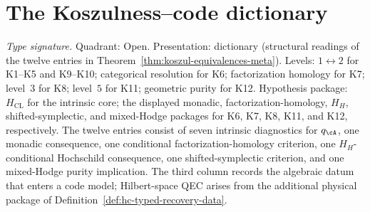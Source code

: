 %
%

\section{The Koszulness--code dictionary}
\label{sec:hc-dictionary}

\begin{proposition}
\label{prop:hc-dictionary}
\textit{Type signature.} Quadrant: Open. Presentation: dictionary
(structural readings of the twelve entries in
Theorem~\ref{thm:koszul-equivalences-meta}). Levels:
$1\!\leftrightarrow\!2$ for K1--K5 and K9--K10; categorical
resolution for K6; factorization homology for K7; level~$3$ for K8;
level~$5$ for K11; geometric purity for K12. Hypothesis package:
$H_{\mathrm{CL}}$ for the intrinsic core; the displayed monadic,
factorization-homology, $H_H$, shifted-symplectic, and mixed-Hodge
packages for K6, K7, K8, K11, and K12, respectively.
\smallskip\noindent
The twelve entries consist of seven intrinsic diagnostics for
$q_\cA$, one monadic consequence, one conditional
factorization-homology criterion, one $H_H$-conditional Hochschild
consequence, one shifted-symplectic criterion, and one mixed-Hodge
purity implication.  The third column records the algebraic datum
that enters a code model; Hilbert-space QEC arises from the additional
physical package of Definition~\ref{def:hc-typed-recovery-data}.


\end{proposition}
